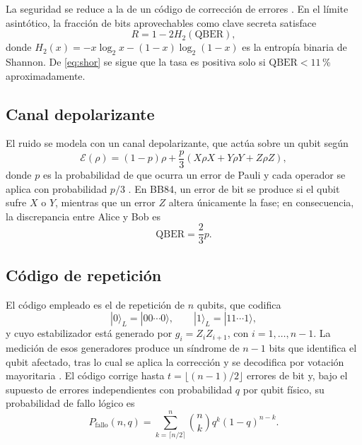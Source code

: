\documentclass[conference]{IEEEtran}
\begin{document}
La seguridad se reduce a la de un código de corrección de errores
\cite{shor2000}. En el límite asintótico, la fracción de bits aprovechables como
clave secreta satisface
\begin{equation}
R = 1 - 2H_2(\mathrm{QBER}),
\label{eq:shor}
\end{equation}
donde $H_2(x) = -x\log_2 x - (1-x)\log_2(1-x)$ es la entropía binaria de
Shannon. De \eqref{eq:shor} se sigue que la tasa es positiva solo si
$\mathrm{QBER} < 11$\,\% aproximadamente.

\subsection{Canal depolarizante}

El ruido se modela con un canal depolarizante, que actúa sobre un qubit según
\begin{equation}
\mathcal{E}(\rho) = (1-p)\rho + \frac{p}{3}\left(X\rho X + Y\rho Y + Z\rho Z
\right),
\label{eq:canal}
\end{equation}
donde $p$ es la probabilidad de que ocurra un error de Pauli y cada operador se
aplica con probabilidad $p/3$ \cite{nielsen2010}. En BB84, un error de bit se
produce si el qubit sufre $X$ o $Y$, mientras que un error $Z$ altera únicamente
la fase; en consecuencia, la discrepancia entre Alice y Bob es
\begin{equation}
\mathrm{QBER} = \frac{2}{3}p .
\label{eq:qber}
\end{equation}

\subsection{Código de repetición}

El código empleado es el de repetición de $n$ qubits, que codifica
\begin{equation}
|0\rangle_L = |00\cdots 0\rangle, \qquad
|1\rangle_L = |11\cdots 1\rangle,
\label{eq:codigo}
\end{equation}
y cuyo estabilizador está generado por $g_i = Z_iZ_{i+1}$, con
$i=1,\ldots,n-1$. La medición de esos generadores produce un síndrome de $n-1$
bits que identifica el qubit afectado, tras lo cual se aplica la corrección y se
decodifica por votación mayoritaria \cite{nielsen2010}. El código corrige hasta
$t=\lfloor (n-1)/2 \rfloor$ errores de bit y, bajo el supuesto de errores
independientes con probabilidad $q$ por qubit físico, su probabilidad de fallo
lógico es
\begin{equation}
P_{\text{fallo}}(n,q) = \sum_{k=\lceil n/2 \rceil}^{n} \binom{n}{k}
q^{k}(1-q)^{n-k}.
\label{eq:fallo}
\end{equation}
\end{document}
